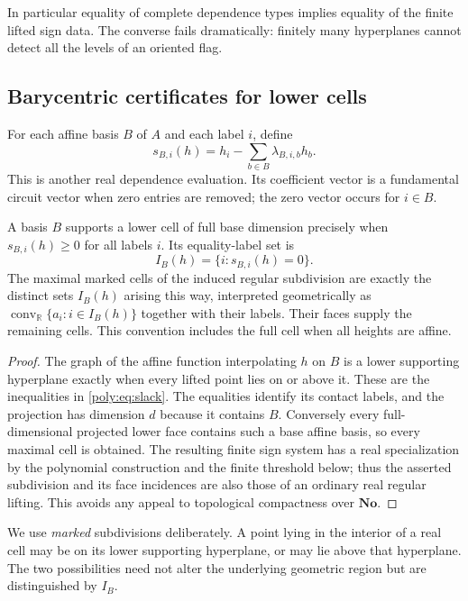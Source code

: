\documentclass[11pt,a4paper]{article}
\numberwithin{equation}{section}
\theoremstyle{plain}
\newcommand{\No}{\mathbf{No}}
\newcommand{\R}{\mathbb R}
\newcommand{\conv}{\operatorname{conv}}
\begin{document}
In particular equality of complete dependence types implies equality of the
finite lifted sign data. The converse fails dramatically: finitely many
hyperplanes cannot detect all the levels of an oriented flag.

\subsection{Barycentric certificates for lower cells}

For each affine basis $B$ of $A$ and each label $i$, define
\begin{equation}\label{poly:eq:slack}
 s_{B,i}(h)=h_i-\sum_{b\in B}\lambda_{B,i,b}h_b.
\end{equation}
This is another real dependence evaluation. Its coefficient vector is a
fundamental circuit vector when zero entries are removed; the zero vector
occurs for $i\in B$.

\begin{proposition}\label{poly:prop:slack}\label{poly:ts:lem:slack}
A basis $B$ supports a lower cell of full base dimension precisely when
$s_{B,i}(h)\ge0$ for all labels $i$. Its equality-label set is
\[
 I_B(h)=\{i:s_{B,i}(h)=0\}.
\]
The maximal marked cells of the induced regular subdivision are exactly the
distinct sets $I_B(h)$ arising this way, interpreted geometrically as
$\conv_{\R}\{a_i:i\in I_B(h)\}$ together with their labels. Their faces
supply the remaining cells. This convention includes the full cell when
all heights are affine.
\end{proposition}
\begin{proof}
The graph of the affine function interpolating $h$ on $B$ is a lower
supporting hyperplane exactly when every lifted point lies on or above it.
These are the inequalities in \eqref{poly:eq:slack}. The equalities identify its
contact labels, and the projection has dimension $d$ because it contains
$B$. Conversely every full-dimensional projected lower face contains such
a base affine basis, so every maximal cell is obtained.
The resulting finite sign system has a real specialization by the
polynomial construction and the finite threshold below; thus the asserted
subdivision and its face incidences are also those of an ordinary real
regular lifting. This avoids any appeal to topological compactness over
$\No$.
\end{proof}

We use \emph{marked} subdivisions deliberately. A point lying in the
interior of a real cell may be on its lower supporting hyperplane, or may
lie above that hyperplane. The two possibilities need not alter the
underlying geometric region but are distinguished by $I_B$.
\end{document}
